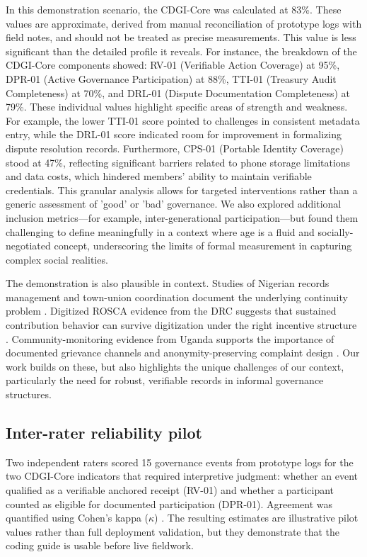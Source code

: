 \documentclass[sigconf,anonymous]{acmart}
\begin{document}
In this demonstration scenario, the CDGI-Core was calculated at 83\%. These values are approximate, derived from manual reconciliation of prototype logs with field notes, and should not be treated as precise measurements. This value is less significant than the detailed profile it reveals. For instance, the breakdown of the CDGI-Core components showed: RV-01 (Verifiable Action Coverage) at 95\%, DPR-01 (Active Governance Participation) at 88\%, TTI-01 (Treasury Audit Completeness) at 70\%, and DRL-01 (Dispute Documentation Completeness) at 79\%. These individual values highlight specific areas of strength and weakness. For example, the lower TTI-01 score pointed to challenges in consistent metadata entry, while the DRL-01 score indicated room for improvement in formalizing dispute resolution records. Furthermore, CPS-01 (Portable Identity Coverage) stood at 47\%, reflecting significant barriers related to phone storage limitations and data costs, which hindered members’ ability to maintain verifiable credentials. This granular analysis allows for targeted interventions rather than a generic assessment of 'good' or 'bad' governance. We also explored additional inclusion metrics---for example, inter-generational participation---but found them challenging to define meaningfully in a context where age is a fluid and socially-negotiated concept, underscoring the limits of formal measurement in capturing complex social realities.

The demonstration is also plausible in context. Studies of Nigerian records management and town-union coordination document the underlying continuity problem \cite{abioye2007, honey1998}. Digitized ROSCA evidence from the DRC suggests that sustained contribution behavior can survive digitization under the right incentive structure \cite{chioda2021}. Community-monitoring evidence from Uganda supports the importance of documented grievance channels and anonymity-preserving complaint design \cite{bjorkman2009}. Our work builds on these, but also highlights the unique challenges of our context, particularly the need for robust, verifiable records in informal governance structures.

\subsection{Inter-rater reliability pilot}

Two independent raters scored 15 governance events from prototype logs for the two CDGI-Core indicators that required interpretive judgment: whether an event qualified as a verifiable anchored receipt (RV-01) and whether a participant counted as eligible for documented participation (DPR-01). Agreement was quantified using Cohen's kappa ($\kappa$) \cite{cohen1960}. The resulting estimates are illustrative pilot values rather than full deployment validation, but they demonstrate that the coding guide is usable before live fieldwork.
\end{document}
